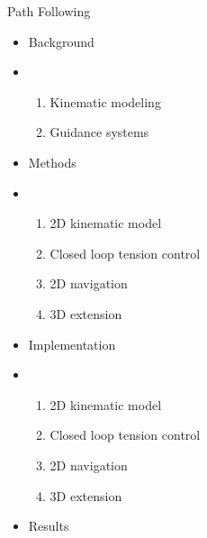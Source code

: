 Path Following
\begin{itemize}
    \item Background
    \item \begin{enumerate}
        \item Kinematic modeling
        \item Guidance systems
    \end{enumerate}
    \item Methods
    \item \begin{enumerate}
        \item 2D kinematic model
        \item Closed loop tension control
        \item 2D navigation
        \item 3D extension
    \end{enumerate}
    \item Implementation
    \item \begin{enumerate}
        \item 2D kinematic model
        \item Closed loop tension control
        \item 2D navigation
        \item 3D extension
    \end{enumerate}
    \item Results
\end{itemize}